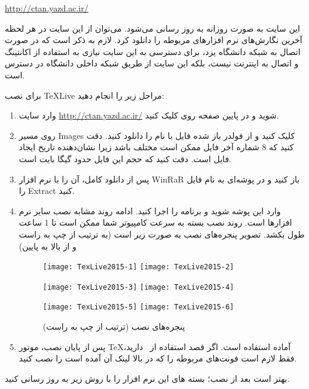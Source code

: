 \centerline{\href{http://ctan.yazd.ac.ir/}{http://ctan.yazd.ac.ir/}}

این سایت به صورت روزانه به روز رسانی می‌شود. می‌توان از این سایت در هر 
لحظه آخرین نگارش‌های نرم افزارهای مربوطه را دانلود کرد. لازم به ذکر است که در صورت اتصال
به شبکه دانشگاه یزد، برای دسترسی به این سایت نیازی به استفاده از اکانتینگ و 
اتصال به اینترنت نیست، بلکه این سایت از طریق شبکه داخلی دانشگاه در دسترس است.

برای نصب TeXLive  مراحل زیر را انجام دهید:
\begin{enumerate}
\item وارد سایت \href{http://ctan.yazd.ac.ir/}{http://ctan.yazd.ac.ir/}
 شوید و در پایین صفحه روی 
 کلیک کنید.
 \item روی مسیر Images کلیک کنید و از فولدر باز شده فایل با نام 
 	 را دانلود کنید. دقت کنید که 8 شماره آخر فایل ممکن 
	است مختلف باشد زیرا نشان‌دهنده تاریخ ایجاد فایل است. دقت کنید که حجم این فایل
	حدود  گیگا بایت است.
 \item پس از دانلود کامل، آن را با نرم افزار WinRaR  باز کنید و در  پوشه‌ای به نام
  فایل را Extract کنید.
 \item وارد این پوشه شوید و برنامه 
 را اجرا کنید. ادامه روند مشابه نصب سایر نرم افزارها 
 است. روند نصب بسته به سرعت کامپیوتر شما ممکن است تا 1 ساعت طول بکشد.
 تصویر پنجره‌های نصب به صورت زیر است (به ترتیب از چپ به راست و از بالا به پایین)
\latin
\begin{figure}[htb]
\texttt{[image: TexLive2015-1]}\hfill
\texttt{[image: TexLive2015-2]}
\vspace*{4mm}

\texttt{[image: TexLive2015-3]}\hfill
\texttt{[image: TexLive2015-4]}
\vspace*{4mm}

\texttt{[image: TexLive2015-5]}\hfill
\texttt{[image: TexLive2015-6]}
\vspace*{4mm}
%
\persian
\caption{پنجره‌های نصب  (ترتیب از چپ به راست)}
\end{figure}
\persian

 \item پس از پایان نصب، موتور \TeX آماده استفاده است. اگر قصد استفاده از \XePersian
 \ دارید، فقط لازم است فونت‌های مربوطه را که در بالا لینک آن آمده است را نصب کنید.
\end{enumerate}
بهتر است بعد از نصب؛ بسته های این نرم افزار را با روش زیر به روز رسانی کنید.
